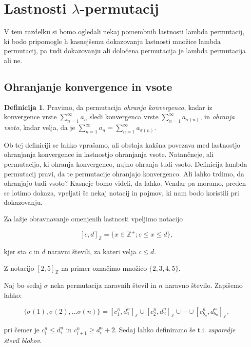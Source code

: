 \documentclass[12pt,a4paper,reqno]{amsart}
\theoremstyle{definition} %
\newtheorem{definicija}{Definicija}[section]
\theoremstyle{plain} %
\newcommand{\Z}{\mathbb Z}
\begin{document}
\section{Lastnosti $\lambda$-permutacij}

V tem razdelku si bomo ogledali nekaj pomembnih lastnosti lambda permutacij, ki bodo pripomogle h kasnejšemu dokazovanju lastnosti množice lambda permutacij, pa tudi dokazovanju ali določena permutacija je lambda permutacija ali ne.

\subsection{Ohranjanje konvergence in vsote}

\begin{definicija}
Pravimo, da permutacija \emph{ohranja konvergenco}, kadar iz konvergence vrste $\sum^{\infty}_{n=1}a_n$ sledi konvergenca vrste $\sum^{\infty}_{n=1}a_{\sigma (n)}$, in \emph{ohranja vsoto}, kadar velja, da je $\sum^{\infty}_{n=1}a_n=\sum^{\infty}_{n=1}a_{\sigma (n)}$.
\end{definicija}

Ob tej definiciji se lahko vprašamo, ali obstaja kakšna povezava med lastnostjo ohranjanja konvergence in lastnostjo ohranjanja vsote. Natančneje, ali permutacija, ki ohranja konvergenco, nujno ohranja tudi vsoto. Definicija lambda permutacij pravi, da te permutacije ohranjajo konvergenco. Ali lahko trdimo, da ohranjajo tudi vsoto? Kasneje bomo videli, da lahko. Vendar pa moramo, preden se lotimo dokaza, vpeljati še nekaj notacij in pojmov, ki nam bodo koristili pri dokazovanju.

Za lažje obravnavanje omenjenih lastnosti vpeljimo notacijo

$$[c,d]_{\Z}=\{x \in \Z^+ ; c \leq x \leq d \},$$

kjer sta $c$ in $d$ naravni števili, za kateri velja $c\leq d$. 

Z notacijo $[2,5]_{\Z}$ na primer označimo množico $\{2,3,4,5\}$.

Naj bo sedaj $\sigma$ neka permutacija naravnih števil in $n$ naravno število. Zapišemo lahko:

\begin{equation} \label{eq:4}
\{ \sigma (1), \sigma (2), \ldots \sigma (n) \} = [c^n_1, d^n_1]_{\Z} \cup [c^n_2, d^n_2]_{\Z} \cup \cdots \cup [c^n_{b_n}, d^n_{b_n}]_{\Z},
\end{equation} 

pri čemer je $c^n_i \leq d^n_i$ in $c^n_{i+1} \geq d^n_i +2$. Sedaj lahko definiramo še t.i. \emph{zaporedje števil blokov}.
\end{document}
